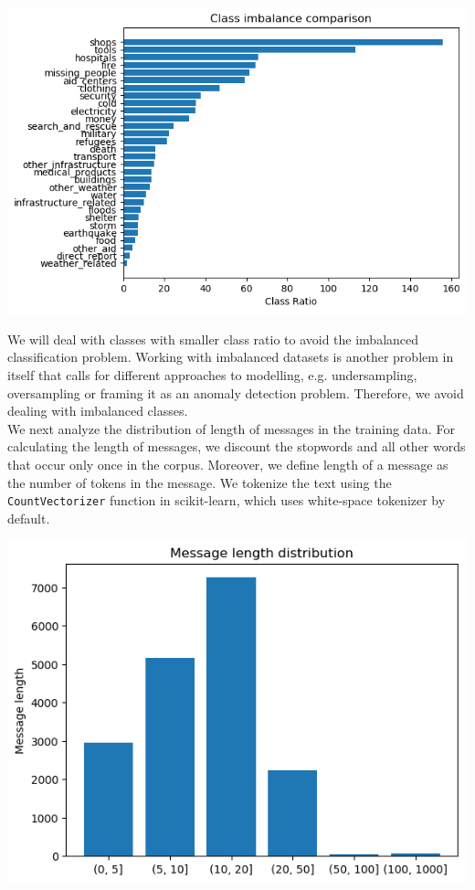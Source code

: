 \documentclass{article}
\begin{document}
\begin{center}
	\includegraphics[scale=0.8]{class_ratio}
\end{center}

We will deal with classes with smaller class ratio to avoid the imbalanced classification problem. Working with imbalanced datasets is another problem in itself that calls for different approaches to modelling, e.g. undersampling, oversampling or framing it as an anomaly detection problem. Therefore, we avoid dealing with imbalanced classes.
\\

We next analyze the distribution of length of messages in the training data. For calculating the length of messages, we discount the stopwords and all other words that occur only once in the corpus. Moreover, we define length of a message as the number of tokens in the message. We tokenize the text using the \texttt{CountVectorizer} function in scikit-learn, which uses white-space tokenizer by default.

\begin{center}
	\includegraphics[scale=0.7]{sen_len_dist}
\end{center}
\end{document}
